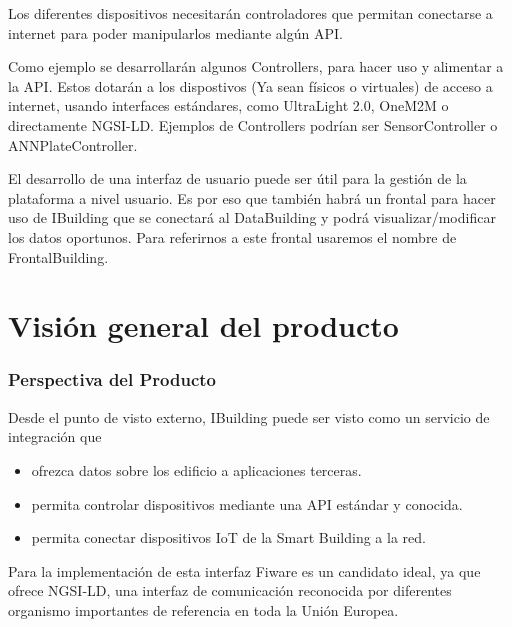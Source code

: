\documentclass[12pt, a4paper, twoside]{article}
\begin{document}
Los diferentes dispositivos necesitarán controladores que permitan conectarse
a internet para poder manipularlos mediante algún API.

Como ejemplo se desarrollarán algunos Controllers, para hacer uso y alimentar a la API.
Estos dotarán a los dispostivos (Ya sean físicos o virtuales) de acceso a internet, usando interfaces 
estándares, como UltraLight 2.0, OneM2M o directamente NGSI-LD. Ejemplos de Controllers podrían
ser SensorController o ANNPlateController.

El desarrollo de una interfaz de usuario puede ser útil para la gestión de la plataforma
a nivel usuario. Es por eso que también habrá un frontal para hacer uso de IBuilding
que se conectará al DataBuilding y podrá visualizar/modificar los datos oportunos.
Para referirnos a este frontal usaremos el nombre de FrontalBuilding.


\section{Visión general del producto}
\subsubsection{Perspectiva del Producto}
Desde el punto de visto externo, IBuilding puede ser visto como un servicio de integración que
\begin{itemize}
  \item ofrezca datos sobre los edificio a aplicaciones terceras.
  \item permita controlar dispositivos mediante una API estándar y conocida.
  \item permita conectar dispositivos IoT de la Smart Building a la red.
\end{itemize}

Para la implementación de esta interfaz Fiware es un candidato ideal, ya que ofrece NGSI-LD,
una interfaz de comunicación reconocida por diferentes organismo importantes de referencia en toda la Unión Europea.
\end{document}
